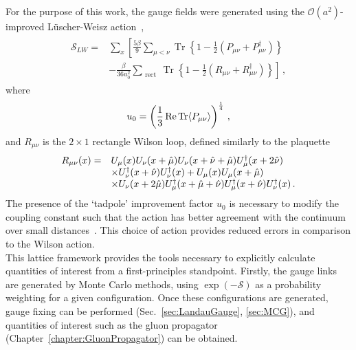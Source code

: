 For the purpose of this work, the gauge fields were generated using the $\mathcal{O}(a^2)$-improved L\"uscher-Weisz action~\cite{Luscher:1984xn}, 
%
\begin{align}
\begin{aligned} \mathcal{S} _ { LW } = &\sum_x \left[ \frac { 5 \beta } { 9 } \sum _ { \mu < \nu } \operatorname { Tr } \left\{ 1 - \frac { 1 } { 2 } \left( P _ { \mu \nu } + P _ { \mu \nu } ^ { \dagger } \right) \right\}\right. \\
& \left.- \frac { \beta } { 36 u _ { 0 } ^ { 2 } } \sum _ { \text { rect } } \operatorname { Tr } \left\{ 1 - \frac { 1 } { 2 } \left( R _ { \mu \nu } + R _ { \mu \nu } ^ { \dagger } \right) \right\}\right]\, , \end{aligned}
\end{align}
%
where
\begin{equation}
u_0 = \left(\frac{1}{3}\operatorname{ Re } \operatorname{Tr}\langle P_{\mu\nu} \rangle\right)^{\frac{1}{4}}\, ,
\end{equation}
and $R_{\mu\nu}$ is the $2\times 1$ rectangle Wilson loop, defined similarly to the plaquette 
\begin{align}
\begin{array} { r l } { R _ { \mu \nu } ( x ) = } & { U _ { \mu } ( x ) U _ { \nu } ( x + \hat { \mu } ) U _ { \nu } ( x + \hat { \nu } + \hat { \mu } ) U _ { \mu } ^ { \dagger } ( x + 2 \hat { \nu } ) } \\ { } & { \times U _ { \nu } ^ { \dagger } ( x + \hat { \nu } ) U _ { \nu } ^ { \dagger } ( x ) + U _ { \mu } ( x ) U _ { \mu } ( x + \hat { \mu } ) } \\ { } & { \times U _ { \nu } ( x + 2 \hat { \mu } ) U _ { \mu } ^ { \dagger } ( x + \hat { \mu } + \hat { \nu } ) U _ { \mu } ^ { \dagger } ( x + \hat { \nu } ) U _ { \nu } ^ { \dagger } ( x ) }\, . \end{array}
\end{align}
The presence of the `tadpole' improvement factor $u_0$ is necessary to modify the coupling constant such that the action has better agreement with the continuum over small distances~\cite{Lepage:1992xa}. This choice of action provides reduced errors in comparison to the Wilson action.\\

This lattice framework provides the tools necessary to explicitly calculate quantities of interest from a first-principles standpoint. Firstly, the gauge links are generated by Monte Carlo methods, using $\exp\left(-\mathcal{S}\right)$ as a probability weighting for a given configuration. Once these configurations are generated, gauge fixing can be performed (Sec.~\ref{sec:LandauGauge}, \ref{sec:MCG}), and quantities of interest such as the gluon propagator (Chapter~\ref{chapter:GluonPropagator}) can be obtained.

